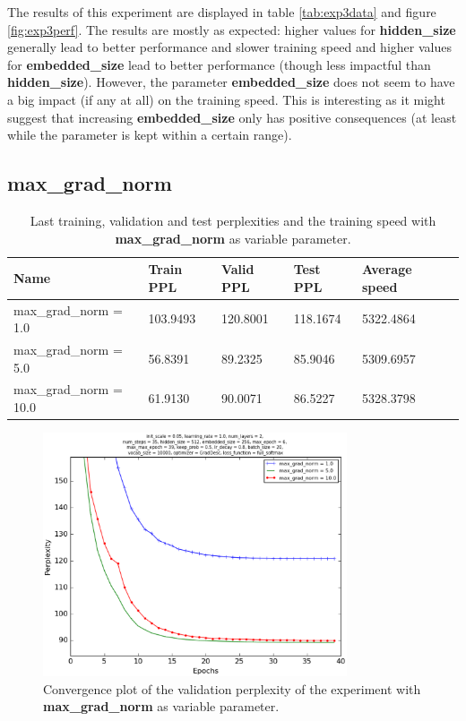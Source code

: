 \documentclass[10pt,a4paper,titlepage]{article}
\begin{document}
The results of this experiment are displayed in table \ref{tab:exp3data} and figure \ref{fig:exp3perf}. The results are mostly as expected: higher values for \textbf{hidden\_size} generally lead to better performance and slower training speed and higher values for \textbf{embedded\_size} lead to better performance (though less impactful than \textbf{hidden\_size}). However, the parameter \textbf{embedded\_size} does not seem to have a big impact (if any at all) on the training speed. This is interesting as it might suggest that increasing \textbf{embedded\_size} only has positive consequences (at least while the parameter is kept within a certain range).
\newpage

\subsection{max\_grad\_norm}

\begin{table}[H]
\centering
\caption{Last training, validation and test perplexities and the training speed with \textbf{max\_grad\_norm} as variable parameter.}
\label{tab:exp4data}
\begin{tabular}{|l|l|l|l|l|l|}
\hline
{\small Name} & {\small Train PPL} & {\small Valid PPL} & {\small Test PPL} & {\small Average speed}\\ \hline
{\small max\_grad\_norm = 1.0}                           & 103.9493   & 120.8001   & 118.1674   & 5322.4864  \\ \hline
{\small max\_grad\_norm = 5.0 }                          & 56.8391    & 89.2325    & 85.9046    & 5309.6957  \\ \hline
{\small max\_grad\_norm = 10.0 }                         & 61.9130    & 90.0071    & 86.5227    & 5328.3798  \\ \hline
\end{tabular}
\end{table}

\begin{figure}[H]
	\begin{center}
		\includegraphics[width=0.80\textwidth]{Figures/maxgradperf.eps}
		\caption{Convergence plot of the validation perplexity of the experiment with \textbf{max\_grad\_norm} as variable parameter. }
		\label{fig:exp4perf}
	\end{center}	
\end{figure}
\end{document}
